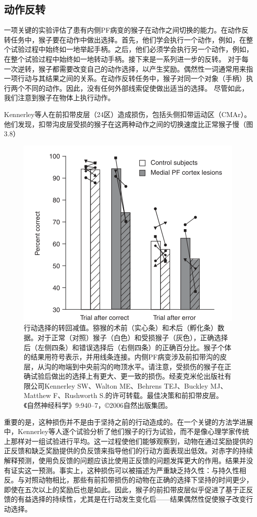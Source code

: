 \subsection{动作反转}
一项关键的实验评估了患有内侧PF病变的猴子在动作之间切换的能力\cite{Kennerleyet al,2006}。在动作反转任务中，猴子要在动作中做出选择。首先，他们学会执行一个动作，例如，在整个试验过程中始终如一地举起手柄。之后，他们必须学会执行另一个动作，例如，在整个试验过程中始终如一地转动手柄。接下来是一系列进一步的反转。
对于每一次逆转，猴子都需要改变自己的动作选择，以产生奖励。偶然性一词通常用来指一项行动与其结果之间的关系。在动作反转任务中，猴子对同一个对象（手柄）执行两个不同的动作。因此，没有任何外部线索促使做出适当的选择。
尽管如此，我们注意到猴子在物体上执行动作。\par
Kennerley等人在前扣带皮层（24区）造成损伤，包括头侧扣带运动区（CMAr）。他们发现，扣带沟皮层受损的猴子在这两种动作之间的切换速度比正常猴子慢（图3.8）\par
\begin{figure}[!htb]
	\centering
 	\includegraphics{image_pfc/Fig_3_8}
	\caption{行动选择的转回减值。猕猴的术前（实心条）和术后（孵化条）数据。对于正常（对照）猴子（白色）和受损猴子（灰色），正确选择后（左侧四条）和错误选择后（右侧四条）的正确百分比。猴子个体的结果用符号表示，并用线条连接。内侧PF病变涉及前扣带沟的皮层，从沟的吻端到中央前沟的吻顶水平。请注意，受损伤的猴子在正确试验后做出的选择上有更大、更一致的损伤。经麦克米伦出版社有限公司Kennerley SW、Walton ME、Behrens TEJ、Buckley MJ、Matthew F、Rushworth S.的许可转载。最佳决策和前扣带皮层。《自然神经科学》9:940–7，©2006自然出版集团。}
	\label{fig:fig}
\end{figure}
重要的是，这种损伤并不是由于坚持之前的行动造成的。在一个关键的方法学进展中，Kennerley等人逐个试验分析了他们猴子的行为试验，而不是像心理学家传统上那样对一组试验进行平均。这一过程使他们能够观察到，动物在通过奖励提供的正反馈和缺乏奖励提供的负反馈来指导他们的行动方面表现出低效。对赤字的持续解释预测，使用负反馈的问题应该比使用正反馈的问题发挥更大的作用。结果并没有证实这一预测。事实上，这种损伤可以被描述为严重缺乏持久性：与持久性相反。与对照动物相比，那些有前扣带损伤的动物在正确的选择下坚持的时间更少，即使在五次以上的奖励后也是如此。因此，猴子的前扣带皮层似乎促进了基于正反馈的有益选择的持续性，尤其是在行动发生变化后——结果偶然性促使猴子改变行动选择。\par
